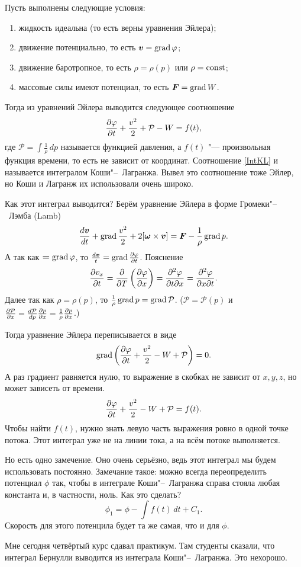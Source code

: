 Пусть выполнены следующие условия:
\begin{enumerate}
\item жидкость идеальна (то есть верны уравнения Эйлера);
\item движение потенциально, то есть $\boldsymbol{v}=\operatorname{grad}\varphi$;
\item движение баротропное, то есть $\rho = \rho(p)$ или $\rho=\operatorname{const}$;
\item массовые силы имеют потенциал, то есть $\boldsymbol{F} = \operatorname{grad} W$.
\end{enumerate}
Тогда из уравнений Эйлера выводится следующее соотношение
\begin{equation}\label{IntKL}
  \frac{\partial \varphi}{\partial t}+\frac{v^2}2+\mathcal P-W = f(t),
\end{equation}
где $\mathcal P = \int\frac1\rho\,dp$ называется функцией давления, а $f(t)$ "--- произвольная функция времени, то есть не зависит от координат. Соотношение \eqref{IntKL} и называется интегралом Коши"--~Лагранжа. Вывел это соотношение тоже Эйлер, но Коши и Лагранж их использовали очень широко.

Как этот интеграл выводится? Берём уравнение Эйлера в форме Громеки"--~Лэмба (Lamb)
\[
  \frac{d\boldsymbol{v}}{dt}+\operatorname{grad}\frac{v^2}2+2[\boldsymbol{\omega}\times\boldsymbol{v}] = \boldsymbol{F} - \frac1\rho\operatorname{grad} p.
\]
А так как $\boldsymbol{=} \operatorname{grad}\varphi$, то $\frac{d\boldsymbol{v}}{t} = \operatorname{grad}\frac{\partial \varphi}{\partial t}$. Пояснение
\[
  \frac{\partial v_x}{\partial t} = \frac{\partial }{\partial T}\left(\frac{\partial \varphi}{\partial x}\right) = \frac{\partial ^2\varphi}{\partial t\partial x}= \frac{\partial ^2\varphi}{\partial x\partial t}.
\]
Далее так как  $\rho = \rho(p)$, то $\frac1\rho\operatorname{grad} p = \operatorname{grad}\mathcal P$. ($\mathcal P=\mathcal P(p)$ и $\frac{\partial \mathcal P}{\partial x} = \frac{d\mathcal P}{dp}\frac{\partial p}{\partial x} = \frac1\rho\frac{\partial p}{\partial x}$.)

Тогда уравнение Эйлера переписывается в виде
\[
  \operatorname{grad}\left(\frac{\partial \varphi}{\partial t}+\frac{v^2}2-W+\mathcal P\right) = 0.
\]
А раз градиент равняется нулю, то выражение в скобках не зависит от $x,y,z$, но может зависеть от времени.
\[
\frac{\partial \varphi}{\partial t}+\frac{v^2}2-W+\mathcal P = f(t).
\]
Чтобы найти $f(t)$, нужно знать левую часть выражения ровно в одной точке потока. Этот интеграл уже не на линии тока, а на всём потоке выполняется.

Но есть одно замечение. Оно очень серьёзно, ведь этот интеграл мы будем использовать постоянно. Замечание такое: можно всегда переопределить потенциал $\phi$ так, чтобы в интеграле Коши"--~Лагранжа справа стояла любая константа и, в частности, ноль. Как это сделать?
\[ \phi_1 = \phi - \int f(t)\,dt + C_1.\]
Скорость для этого потенцила будет та же самая, что и для $\phi$.

Мне сегодня четвёртый курс сдавал практикум. Там студенты сказали, что интеграл Бернулли выводится из интеграла Коши"--~Лагранжа. Это нехорошо.
